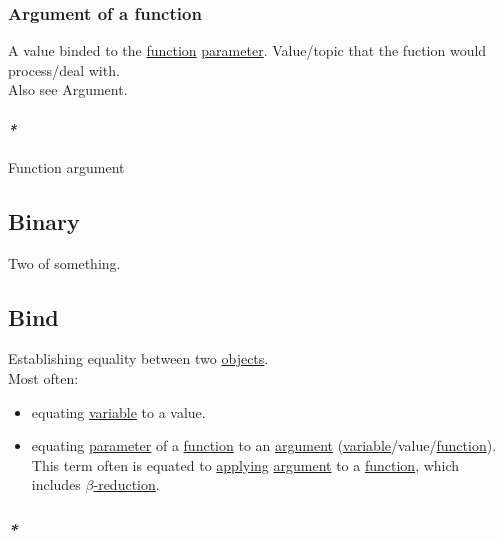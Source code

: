 \documentclass[11pt]{article}
\begin{document}
\subsubsection{\label{org5a35bc9}Argument of a function}
\label{sec:org62761eb}
A value binded to the \hyperref[orge15bc14]{function} \hyperref[org0e7674e]{parameter}. Value/topic that the fuction would process/deal with.\\

Also see \label{org86f0ab7}Argument.\\

\paragraph{\emph{*}}
\label{sec:org1584132}

\label{org374fed3}Function argument\\

\subsection{\label{org57bd48f}Binary}
\label{sec:orgc3eed74}
Two of something.\\

\subsection{\label{org07cdf3f}Bind}
\label{sec:org4fb1c42}
Establishing equality between two \hyperref[org363acc2]{objects}.\\

Most often:\\
\begin{itemize}
\item equating \hyperref[org0b57594]{variable} to a value.\\
\item equating \hyperref[org0e7674e]{parameter} of a \hyperref[orge15bc14]{function} to an \hyperref[orga6b7e97]{argument} (\hyperref[org0b57594]{variable}/value/\hyperref[orge15bc14]{function}). This term often is equated to \hyperref[org6b37c0b]{applying} \hyperref[orga6b7e97]{argument} to a \hyperref[orge15bc14]{function}, which includes \hyperref[org687fe93]{\(\beta\)-reduction}.\\
\end{itemize}

\subsubsection{\emph{*}}
\label{sec:org1eb7c99}
\end{document}
